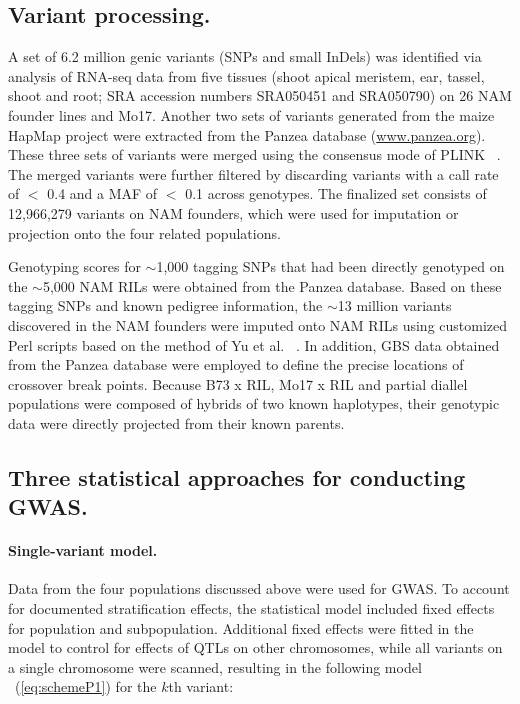 \documentclass[10pt,letterpaper]{article}
\begin{document}
\subsection*{Variant processing.}
A set of 6.2 million genic variants (SNPs and small InDels) was identified via analysis of RNA-seq data from five tissues (shoot apical meristem, ear, tassel, shoot and root; SRA accession numbers SRA050451 and SRA050790) on 26 NAM founder lines and Mo17. Another two sets of variants generated from the maize HapMap project were extracted from the Panzea database (\url{www.panzea.org}). These three sets of variants were merged using the consensus mode of PLINK ~\cite{Purcell2007}. The merged variants were further filtered by discarding variants with a call rate of $<$ 0.4 and a MAF of $<$ 0.1 across genotypes. The finalized set consists of 12,966,279 variants on NAM founders, which were used for imputation or projection onto the four related populations.

Genotyping scores for $\sim$1,000 tagging SNPs that had been directly genotyped on the $\sim$5,000 NAM RILs were obtained from the Panzea database. Based on these tagging SNPs and known pedigree information, the $\sim$13 million variants discovered in the NAM founders were imputed onto NAM RILs using customized Perl scripts based on the method of Yu et al. ~\cite{Yu2008}. In addition, GBS data obtained from the Panzea database were employed to define the precise locations of crossover break points. Because B73 x RIL, Mo17 x RIL and partial diallel populations were composed of hybrids of two known haplotypes, their genotypic data were directly projected from their known parents. 

\subsection*{Three statistical approaches for conducting GWAS.}
\paragraph{Single-variant model.} 
Data from the four populations discussed above were used for GWAS. To account for documented stratification effects, the statistical model included fixed effects for population and subpopulation. Additional fixed effects were fitted in the model to control for effects of QTLs on other chromosomes, while all variants on a single chromosome were scanned, resulting in the following model ~(\ref{eq:schemeP1}) for the $k$th variant:  
\end{document}
